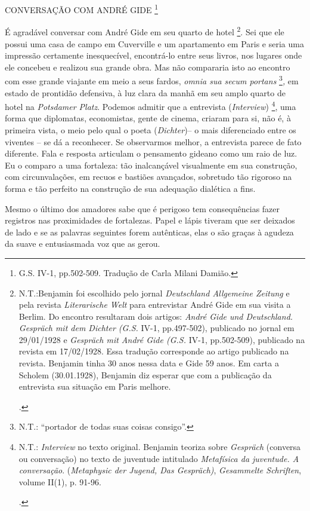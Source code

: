 CONVERSAÇÃO COM ANDRÉ GIDE \footnote{G.S. IV-1, pp.502-509. Tradução de
  Carla Milani Damião.}

É agradável conversar com André Gide em seu quarto de hotel \footnote{N.T.:Benjamin
  foi escolhido pelo jornal \emph{Deutschland Allgemeine Zeitung} e pela
  revista \emph{Literarische Welt} para entrevistar André Gide em sua
  visita a Berlim. Do encontro resultaram dois artigos: \emph{André Gide
  und Deutschland. Gespräch mit dem Dichter (G.S.} IV-1, pp.497-502),
  publicado no jornal em 29/01/1928 e \emph{Gespräch mit André Gide
  (G.S.} IV-1, pp.502-509), publicado na revista em 17/02/1928. Essa
  tradução corresponde ao artigo publicado na revista. Benjamin tinha 30
  anos nessa data e Gide 59 anos. Em carta a Scholem (30.01.1928),
  Benjamin diz esperar que com a publicação da entrevista sua situação
  em Paris melhore.

  .}. Sei que ele possui uma casa de campo em Cuverville e um
apartamento em Paris e seria uma impressão certamente inesquecível,
encontrá-lo entre seus livros, nos lugares onde ele concebeu e realizou
sua grande obra. Mas não compararia isto ao encontro com esse grande
viajante em meio a seus fardos, \emph{omnia sua secum portans}
\footnote{N.T.: ``portador de todas suas coisas consigo''.}\emph{,} em
estado de prontidão defensiva, à luz clara da manhã em seu amplo quarto
de hotel na \emph{Potsdamer Platz}. Podemos admitir que a entrevista
(\emph{Interview}) \footnote{N.T.: \emph{Interview} no texto original.
  Benjamin teoriza sobre \emph{Gespräch} (conversa ou conversação) no
  texto de juventude intitulado \emph{Metafísica da juventude. A
  conversação}. (\emph{Metaphysic der Jugend, Das Gespräch)},
  \emph{Gesammelte Schriften}, volume II(1), p. 91-96.

  .}, uma forma que diplomatas, economistas, gente de cinema, criaram
para si, não é, à primeira vista, o meio pelo qual o poeta
(\emph{Dichter})-- o mais diferenciado entre os viventes -- se dá a
reconhecer. Se observarmos melhor, a entrevista parece de fato
diferente. Fala e resposta articulam o pensamento gideano como um raio
de luz. Eu o comparo a uma fortaleza: tão inalcançável visualmente em
sua construção, com circunvalações, em recuos e bastiões avançados,
sobretudo tão rigoroso na forma e tão perfeito na construção de sua
adequação dialética a fins.

Mesmo o último dos amadores sabe que é perigoso tem consequências fazer
registros nas proximidades de fortalezas. Papel e lápis tiveram que ser
deixados de lado e se as palavras seguintes forem autênticas, elas o são
graças à agudeza da suave e entusiasmada voz que as gerou.

